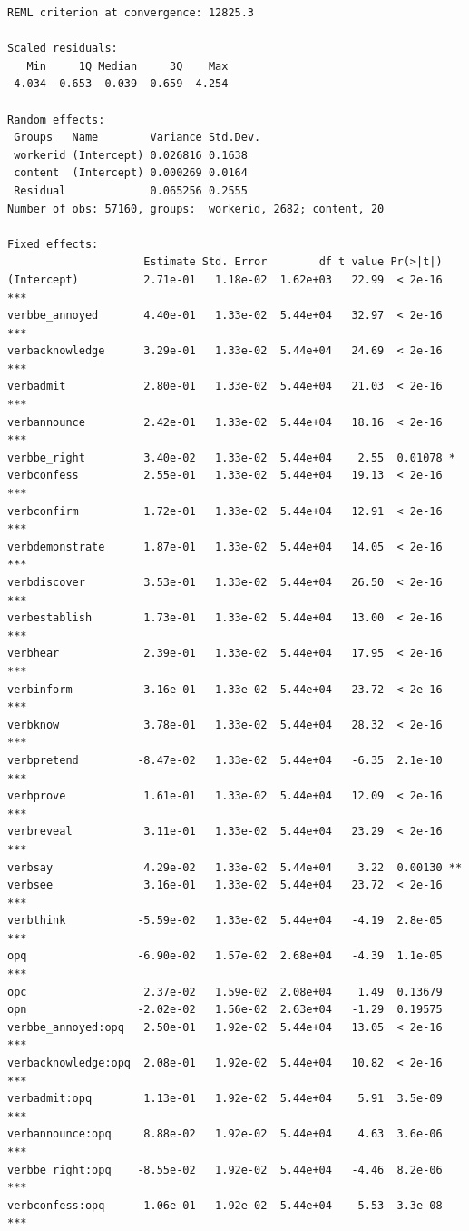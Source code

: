 \documentclass[10pt]{article}\usepackage[]{graphicx}\usepackage[dvipsnames]{xcolor}
\makeatletter
\newenvironment{kframe}{%
 \def\at@end@of@kframe{}%
 \ifinner\ifhmode%
  \def\at@end@of@kframe{\end{minipage}}%
  \begin{minipage}{\columnwidth}%
 \fi\fi%
 \def\FrameCommand##1{\hskip\@totalleftmargin \hskip-\fboxsep
 \colorbox{shadecolor}{##1}\hskip-\fboxsep
     \hskip-\linewidth \hskip-\@totalleftmargin \hskip\columnwidth}%
 \MakeFramed {\advance\hsize-\width
   \@totalleftmargin\z@ \linewidth\hsize
   \@setminipage}}%
 {\par\unskip\endMakeFramed%
 \at@end@of@kframe}
\newenvironment{knitrout}{}{} %
\makeatother
\begin{document}
\begin{knitrout}
\begin{kframe}
\begin{verbatim}
REML criterion at convergence: 12825.3

Scaled residuals: 
   Min     1Q Median     3Q    Max 
-4.034 -0.653  0.039  0.659  4.254 

Random effects:
 Groups   Name        Variance Std.Dev.
 workerid (Intercept) 0.026816 0.1638  
 content  (Intercept) 0.000269 0.0164  
 Residual             0.065256 0.2555  
Number of obs: 57160, groups:  workerid, 2682; content, 20

Fixed effects:
                     Estimate Std. Error        df t value Pr(>|t|)    
(Intercept)          2.71e-01   1.18e-02  1.62e+03   22.99  < 2e-16 ***
verbbe_annoyed       4.40e-01   1.33e-02  5.44e+04   32.97  < 2e-16 ***
verbacknowledge      3.29e-01   1.33e-02  5.44e+04   24.69  < 2e-16 ***
verbadmit            2.80e-01   1.33e-02  5.44e+04   21.03  < 2e-16 ***
verbannounce         2.42e-01   1.33e-02  5.44e+04   18.16  < 2e-16 ***
verbbe_right         3.40e-02   1.33e-02  5.44e+04    2.55  0.01078 *  
verbconfess          2.55e-01   1.33e-02  5.44e+04   19.13  < 2e-16 ***
verbconfirm          1.72e-01   1.33e-02  5.44e+04   12.91  < 2e-16 ***
verbdemonstrate      1.87e-01   1.33e-02  5.44e+04   14.05  < 2e-16 ***
verbdiscover         3.53e-01   1.33e-02  5.44e+04   26.50  < 2e-16 ***
verbestablish        1.73e-01   1.33e-02  5.44e+04   13.00  < 2e-16 ***
verbhear             2.39e-01   1.33e-02  5.44e+04   17.95  < 2e-16 ***
verbinform           3.16e-01   1.33e-02  5.44e+04   23.72  < 2e-16 ***
verbknow             3.78e-01   1.33e-02  5.44e+04   28.32  < 2e-16 ***
verbpretend         -8.47e-02   1.33e-02  5.44e+04   -6.35  2.1e-10 ***
verbprove            1.61e-01   1.33e-02  5.44e+04   12.09  < 2e-16 ***
verbreveal           3.11e-01   1.33e-02  5.44e+04   23.29  < 2e-16 ***
verbsay              4.29e-02   1.33e-02  5.44e+04    3.22  0.00130 ** 
verbsee              3.16e-01   1.33e-02  5.44e+04   23.72  < 2e-16 ***
verbthink           -5.59e-02   1.33e-02  5.44e+04   -4.19  2.8e-05 ***
opq                 -6.90e-02   1.57e-02  2.68e+04   -4.39  1.1e-05 ***
opc                  2.37e-02   1.59e-02  2.08e+04    1.49  0.13679    
opn                 -2.02e-02   1.56e-02  2.63e+04   -1.29  0.19575    
verbbe_annoyed:opq   2.50e-01   1.92e-02  5.44e+04   13.05  < 2e-16 ***
verbacknowledge:opq  2.08e-01   1.92e-02  5.44e+04   10.82  < 2e-16 ***
verbadmit:opq        1.13e-01   1.92e-02  5.44e+04    5.91  3.5e-09 ***
verbannounce:opq     8.88e-02   1.92e-02  5.44e+04    4.63  3.6e-06 ***
verbbe_right:opq    -8.55e-02   1.92e-02  5.44e+04   -4.46  8.2e-06 ***
verbconfess:opq      1.06e-01   1.92e-02  5.44e+04    5.53  3.3e-08 ***

\end{verbatim}
\end{kframe}
\end{knitrout}
\end{document}
